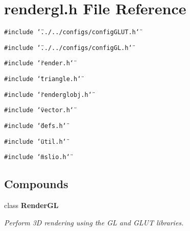 \section{rendergl.h File Reference}
\label{rendergl_8h}
{\tt \#include \char`\"{}../../configs/config\-GLUT.h\char`\"{}}\par
{\tt \#include \char`\"{}../../configs/config\-GL.h\char`\"{}}\par
{\tt \#include \char`\"{}render.h\char`\"{}}\par
{\tt \#include \char`\"{}triangle.h\char`\"{}}\par
{\tt \#include \char`\"{}renderglobj.h\char`\"{}}\par
{\tt \#include \char`\"{}vector.h\char`\"{}}\par
{\tt \#include \char`\"{}defs.h\char`\"{}}\par
{\tt \#include \char`\"{}util.h\char`\"{}}\par
{\tt \#include \char`\"{}mslio.h\char`\"{}}\par
\subsection*{Compounds}
\begin{CompactItemize}
\item 
class {\bf Render\-GL}
\begin{CompactList}\small\item\em Perform 3D rendering using the GL and GLUT libraries.\item\end{CompactList}\end{CompactItemize}
